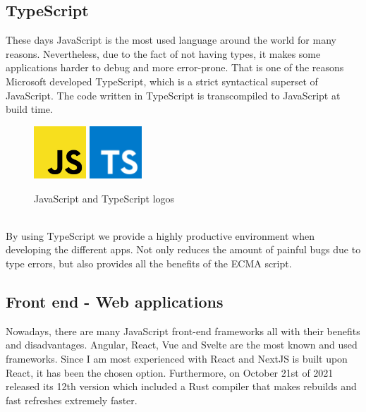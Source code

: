 \documentclass[a4paper, 12pt, oneside]{book}
\begin{document}
\subsection{TypeScript}
These days JavaScript is the most used language around the world for many reasons. Nevertheless, due to the fact of not having types, it makes some applications harder to debug and more error-prone. That is one of the reasons Microsoft developed TypeScript, which is a strict syntactical superset of JavaScript. The code written in TypeScript is transcompiled to JavaScript at build time.
\\
\begin{figure}[h!]
	\centering
	\includegraphics[width=0.175\textwidth]{assets/js-logo.png}
	\includegraphics[width=0.175\textwidth]{assets/ts-logo.png}
	\caption{JavaScript and TypeScript logos}
\end{figure}
\\
By using TypeScript we provide a highly productive environment when developing the different apps. Not only reduces the amount of painful bugs due to type errors, but also provides all the benefits of the ECMA script.
\subsection{Front end - Web applications}
Nowadays, there are many JavaScript front-end frameworks all with their benefits and disadvantages. Angular, React, Vue and Svelte are the most known and used frameworks. Since I am most experienced with React and NextJS is built upon React, it has been the chosen option. Furthermore, on October 21st of 2021 released its 12th version which included a Rust compiler that makes rebuilds and fast refreshes extremely faster.
\end{document}
